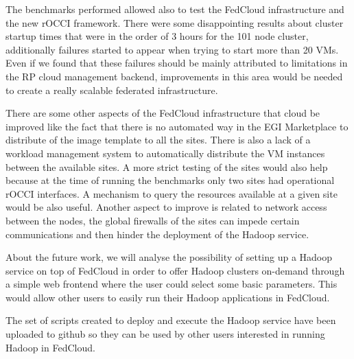 \documentclass[oribibl]{llncs_Ibergrid2013}
\begin{document}
The benchmarks performed allowed also to test the FedCloud infrastructure and the new rOCCI framework. There were some disappointing results about cluster startup times that were in the order of 3 hours for the 101 node cluster, additionally failures started to appear when trying to start more than 20 VMs. Even if we found that these failures should be mainly attributed to limitations in the RP cloud management backend, improvements in this area would be needed to create a really scalable federated infrastructure.

There are some other aspects of the FedCloud infrastructure that cloud be improved like the fact that there is no automated way in the EGI Marketplace to distribute of the image template to all the sites.
There is also a lack of a workload management system to automatically distribute the VM instances between the available sites. A more strict testing of the sites would also help because at the time of running the benchmarks only two sites had operational rOCCI interfaces.
A mechanism to query the resources available at a given site would be also useful.
Another aspect to improve is related to network access between the nodes, the global firewalls of the sites can impede certain communications and then hinder the deployment of the Hadoop service.


About the future work, we will analyse the possibility of setting up a Hadoop service on top of FedCloud in order to offer Hadoop clusters on-demand through a simple web frontend where the user could select some basic parameters. This would allow other users to easily run their Hadoop applications in FedCloud.

The set of scripts created to deploy and execute the Hadoop service have been uploaded to github\cite{scripts} so they can be used by other users interested in running Hadoop in FedCloud.
\end{document}
